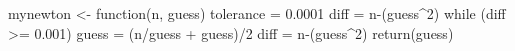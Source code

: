 mynewton <- function(n, guess) {
  tolerance = 0.0001
  diff = n-(guess^2)
  while (diff >= 0.001) {
    guess = (n/guess + guess)/2
    diff = n-(guess^2)
  }
  return(guess)
}
